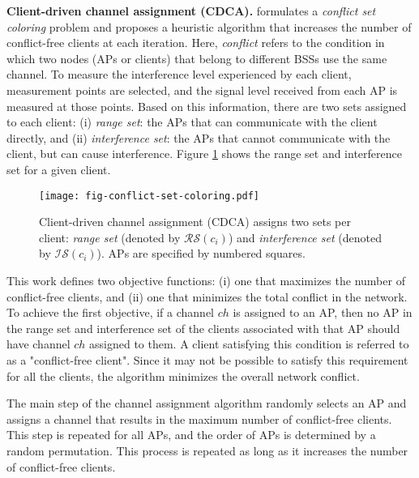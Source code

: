 \label{CDCA}
\textbf{Client-driven channel assignment (CDCA).}
\cite{J-DCA-LB-2006} formulates a \textit{conflict set coloring} problem and proposes a heuristic algorithm that increases the number of conflict-free clients at each iteration. 
Here, \textit{conflict} refers to the condition in which two nodes (APs or clients) that belong to different BSSs use the same channel.
To measure the interference level experienced by each client, measurement points are selected, and the signal level received from each AP is measured at those points. 
Based on this information, there are two sets assigned to each client: (i) \textit{range set}: the APs that can communicate with the client directly, and (ii) \textit{interference set}: the APs that cannot communicate with the client, but can cause interference. 
Figure \ref{fig-conflict-set-coloring} shows the range set and interference set for a given client.
%
\begin{figure}[!t]
	\centering
	\texttt{[image: fig-conflict-set-coloring.pdf]}
	\caption{Client-driven channel assignment (CDCA) \cite{J-DCA-LB-2006} assigns two sets per client: \textit{range set} (denoted by $\mathcal{RS}(c_{i})$) and \textit{interference set} (denoted by $\mathcal{IS}(c_{i})$). APs are specified by numbered squares. %
	}
	\label{fig-conflict-set-coloring}
\end{figure}

This work defines two objective functions: (i) one that maximizes the number of conflict-free clients, and (ii) one that minimizes the total conflict in the network.
To achieve the first objective, if a channel $ch$ is assigned to an AP, then no AP in the range set and interference set of the clients associated with that AP should have channel $ch$ assigned to them.
A client satisfying this condition is referred to as a "conflict-free client".
Since it may not be possible to satisfy this requirement for all the clients, the algorithm minimizes the overall network conflict.

The main step of the channel assignment algorithm randomly selects an AP and assigns a channel that results in the maximum number of conflict-free clients. 
This step is repeated for all APs, and the order of APs is determined by a random permutation. 
This process is repeated as long as it increases the number of conflict-free clients. 

